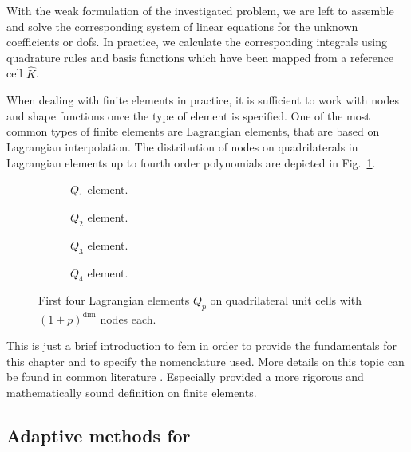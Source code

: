 With the weak formulation of the investigated problem, we are left to assemble and solve the corresponding system of linear equations for the unknown coefficients or \glspl{dof}. In practice, we calculate the corresponding integrals using quadrature rules and basis functions which have been mapped from a reference cell $\widehat{K}$.

When dealing with finite elements in practice, it is sufficient to work with nodes and shape functions once the type of element is specified. One of the most common types of finite elements are Lagrangian elements, that are based on Lagrangian interpolation. The distribution of nodes on quadrilaterals in Lagrangian elements up to fourth order polynomials are depicted in Fig.~\ref{fig:lagrange}.

\begin{figure}
\begin{subfigure}{.24\textwidth}
  \centering
  
  \caption{$Q_1$ element.}
\end{subfigure}
\begin{subfigure}{.24\textwidth}
  \centering
  
  \caption{$Q_2$ element.}
\end{subfigure}
\begin{subfigure}{.24\textwidth}
  \centering
  
  \caption{$Q_3$ element.}
\end{subfigure}
\begin{subfigure}{.24\textwidth}
  \centering
  
  \caption{$Q_4$ element.}
\end{subfigure}
\caption[Lagrangian elements $Q_p$.]{First four Lagrangian elements $Q_p$ on quadrilateral unit cells with $(1+p)^\text{dim}$ nodes each.}
\label{fig:lagrange}
\end{figure}

This is just a brief introduction to \gls{fem} in order to provide the fundamentals for this chapter and to specify the nomenclature used. More details on this topic can be found in common literature \parencite[e.g.][]{girault1986, elman2014, kuzmin2015} . Especially \textcite{brenner2008} provided a more rigorous and mathematically sound definition on finite elements.


\subsection{Adaptive methods for }

